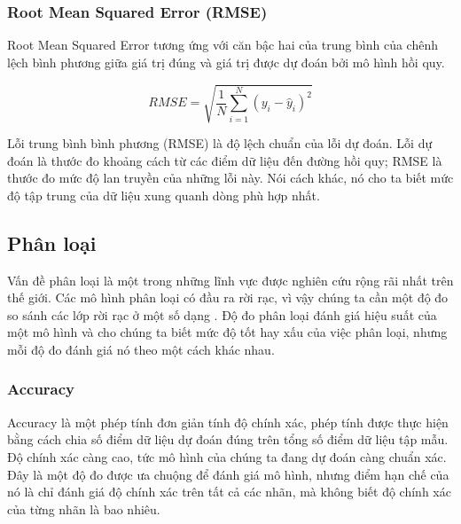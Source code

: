 \subsubsection{Root Mean Squared Error (RMSE)}
Root Mean Squared Error tương ứng với căn bậc hai của trung bình của chênh lệch bình phương giữa giá trị đúng và giá trị được dự đoán bởi mô hình hồi quy. 
\begin{center}
    \begin{equation}
        RMSE = \sqrt {\frac{1}{N}\sum\limits_{i = 1}^N {{{({y_i} - {{\hat y}_i})}^2}} } 
    \end{equation}
\end{center}
Lỗi trung bình bình phương (RMSE) là độ lệch chuẩn của lỗi dự đoán. Lỗi dự đoán là thước đo khoảng cách từ các điểm dữ liệu đến đường hồi quy; RMSE là thước đo mức độ lan truyền của những lỗi này. Nói cách khác, nó cho ta biết mức độ tập trung của dữ liệu xung quanh dòng phù hợp nhất.
\subsection{Phân loại}
Vấn đề phân loại là một trong những lĩnh vực được nghiên cứu rộng rãi nhất trên thế giới. Các mô hình phân loại có đầu ra rời rạc, vì vậy chúng ta cần một độ đo so sánh các lớp rời rạc ở một số dạng . Độ đo  phân loại đánh giá hiệu suất của một mô hình và cho chúng ta biết mức độ tốt hay xấu của việc phân loại, nhưng mỗi độ đo đánh giá nó theo một cách khác nhau.
\subsubsection{Accuracy}
Accuracy là một phép tính đơn giản tính độ chính xác, phép tính được thực hiện bằng cách chia số điểm dữ liệu dự đoán đúng trên tổng số điểm dữ liệu tập mẫu. Độ chính xác càng cao, tức mô hình của chúng ta đang dự đoán càng chuẩn xác. Đây là một độ đo được ưa chuộng để đánh giá mô hình, nhưng điểm hạn chế của nó là chỉ đánh giá độ chính xác trên tất cả các nhãn, mà không biết độ chính xác của từng nhãn là bao nhiêu.

